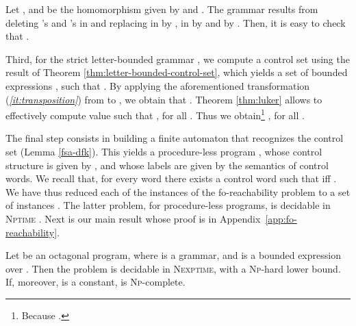 \documentclass[final]{llncs}
\begin{document}
\begin{example}\label{ex:bounded-expression2}
  Let ,  and 
   be the homomorphism given 
  by  and . The grammar  
  results from deleting 's and 's in  and replacing 
   in  by ,  in  by  and  by .
  Then, it is easy to check that . \hfill 
\end{example}

Third, for the strict letter-bounded grammar , we compute
a control set  using the
result of Theorem \ref{thm:letter-bounded-control-set}, which yields
a set of bounded expressions , such
that . 
By applying the aforementioned transformation
({\itshape\ref{it:transposition}}) from 
to , we obtain
that .
Theorem \ref{thm:luker} allows to effectively compute value 
such that , for
all . Thus we obtain\footnote{Because
 .}
, for all .

The final step consists in building a finite
automaton  that recognizes the control
set  (Lemma \ref{fsa-dfk}). This yields a
procedure-less program , whose control structure is
given by , and whose labels are given by the semantics
of control words. We recall that, for every word  there exists a control
word  such
that  if{}f . We
have thus reduced each of the
instances  of the
fo-reachability problem to a set of
instances . The
latter problem, for procedure-less programs, is decidable in
\textsc{Nptime} \cite{bik14}. Next is our main result whose proof is in Appendix~\ref{app:fo-reachability}.

\begin{theorem}\label{thm:fo-reachability}
Let  be an octagonal program,
where  is a grammar, and  is a
bounded expression over . Then the
problem  is decidable
in \textsc{Nexptime}, with a \textsc{Np}-hard lower bound.  If,
moreover,  is a constant,  is \textsc{Np}-complete.
\end{theorem}
\end{document}
